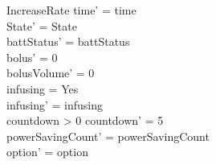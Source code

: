 \begin{schema}{IncreaseRate}
	time' = time\\ 
	State' = State\\
	\pagebreak
	battStatus' = battStatus\\
	bolus' = 0\\
	bolusVolume' = 0\\
	infusing = Yes\\
	infusing' = infusing\\
	countdown > 0 \land countdown' = 5\\
	powerSavingCount' = powerSavingCount\\ option' = option\\
\end{schema}

